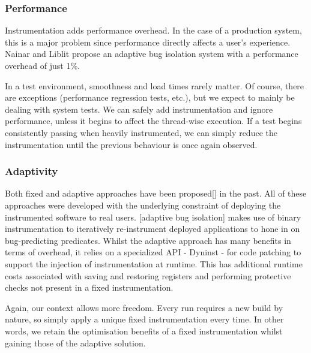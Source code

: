 \subsubsection{Performance}

Instrumentation adds performance overhead. In the case of a production system,
this is a major problem since performance directly affects a user's experience.
Nainar and Liblit \cite{ArumugaNainar:2010:ABI:1806799.1806839} propose an
adaptive bug isolation system with a performance overhead of just 1\%.

In a test environment, smoothness and load times rarely matter. Of course, there
are exceptions (performance regression tests, etc.), but we expect to mainly be
dealing with system tests. We can safely add instrumentation and ignore
performance, unless it begins to affect the thread-wise execution. If a \flaky
test begins consistently passing when heavily instrumented, we can simply reduce
the instrumentation until the previous \flaky behaviour is once again observed.

\subsubsection{Adaptivity}

Both fixed and adaptive approaches have been proposed[] in the past. All of
these approaches were developed with the underlying constraint of deploying the
instrumented software to real users. [adaptive bug isolation] makes use of
binary instrumentation to iteratively re-instrument deployed applications to
hone in on bug-predicting predicates. Whilst the adaptive approach has many
benefits in terms of overhead, it relies on a specialized API - Dyninst - for
code patching to support the injection of  instrumentation at runtime. This has
additional runtime costs \cite{DyninstGuide} associated with saving and
restoring registers and performing protective checks not present in a fixed
instrumentation.

Again, our context allows more freedom. Every run requires a new build by
nature, so simply apply a unique fixed instrumentation every time. In other
words, we retain the optimisation benefits of a fixed instrumentation whilst
gaining those of the adaptive solution.
